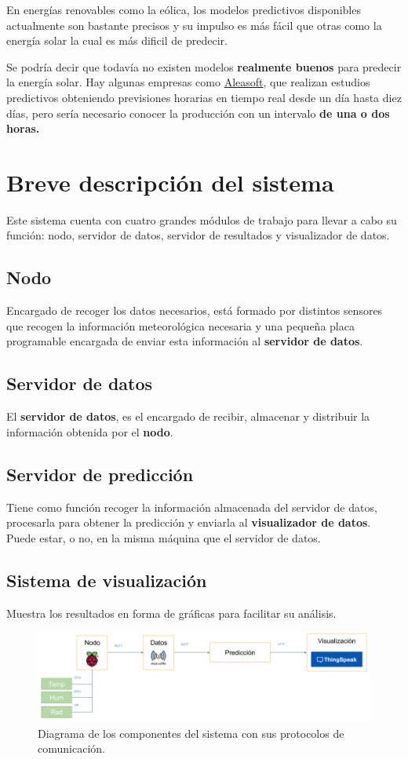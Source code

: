 En energías renovables como la eólica, los modelos predictivos disponibles actualmente son bastante precisos y su impulso es más fácil que otras como la energía solar la cual es más dificil de predecir.

Se podría decir que todavía no existen modelos \textbf{realmente buenos} para predecir la energía solar. Hay algunas empresas como \href{https://aleasoft.com/es/}{Aleasoft}, que realizan estudios predictivos obteniendo previsiones horarias en tiempo real desde un día hasta diez días, pero sería necesario conocer la producción con un intervalo \textbf{de una o dos horas.}

\section{Breve descripción del sistema}
\label{makereference1.2}

Este sistema cuenta con cuatro grandes módulos de trabajo para llevar a cabo su función: nodo, servidor de datos, servidor de resultados y visualizador de datos.

\subsection{Nodo}
\label{makereference1.2.1}
Encargado de recoger los datos necesarios, está formado por distintos sensores que recogen la información meteorológica necesaria y una pequeña placa programable encargada de enviar esta información al \textbf{servidor de datos}.

\subsection{Servidor de datos}
\label{makereference1.2.2}
El \textbf{servidor de datos}, es el encargado de recibir, almacenar y distribuir la información obtenida por el \textbf{nodo}.

\subsection{Servidor de predicción}
\label{makereference1.2.3}
Tiene como función recoger la información almacenada del servidor de datos, procesarla para obtener la predicción y enviarla al \textbf{visualizador de datos}. Puede estar, o no, en la misma máquina que el servidor de datos.

\subsection{Sistema de visualización}
\label{makereference1.2.4}
Muestra los resultados en forma de gráficas para facilitar su análisis.

\begin{figure}[htb]
    \begin{center}
        \includegraphics[width=15cm]{figures/diagrama-sistema.png}
        \caption{Diagrama de los componentes del sistema con sus protocolos de comunicación.}
    \end{center}
    \label{diagrama-sistema}
\end{figure}
